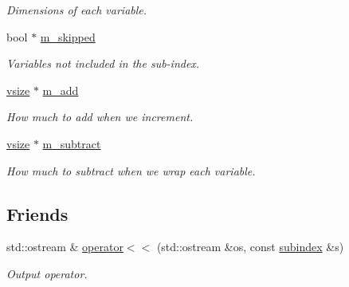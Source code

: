 \begin{DoxyCompactItemize}
\begin{DoxyCompactList}\small\item\em Dimensions of each variable. \end{DoxyCompactList}\item 
\hypertarget{classmerlin_1_1subindex_a5b9ae8404bdc32036922ee2c220da5dc}{}bool $\ast$ \hyperlink{classmerlin_1_1subindex_a5b9ae8404bdc32036922ee2c220da5dc}{m\+\_\+skipped}\label{classmerlin_1_1subindex_a5b9ae8404bdc32036922ee2c220da5dc}

\begin{DoxyCompactList}\small\item\em Variables not included in the sub-\/index. \end{DoxyCompactList}\item 
\hypertarget{classmerlin_1_1subindex_a1dde0ca8f1664ef945f74070711f6816}{}\hyperlink{classmerlin_1_1subindex_a85a7fddb94bd83a77a4a73293c5d613a}{vsize} $\ast$ \hyperlink{classmerlin_1_1subindex_a1dde0ca8f1664ef945f74070711f6816}{m\+\_\+add}\label{classmerlin_1_1subindex_a1dde0ca8f1664ef945f74070711f6816}

\begin{DoxyCompactList}\small\item\em How much to add when we increment. \end{DoxyCompactList}\item 
\hypertarget{classmerlin_1_1subindex_a4366c38983a38191319f53bbee8461ad}{}\hyperlink{classmerlin_1_1subindex_a85a7fddb94bd83a77a4a73293c5d613a}{vsize} $\ast$ \hyperlink{classmerlin_1_1subindex_a4366c38983a38191319f53bbee8461ad}{m\+\_\+subtract}\label{classmerlin_1_1subindex_a4366c38983a38191319f53bbee8461ad}

\begin{DoxyCompactList}\small\item\em How much to subtract when we wrap each variable. \end{DoxyCompactList}\end{DoxyCompactItemize}
\subsection*{Friends}
\begin{DoxyCompactItemize}
\item 
\hypertarget{classmerlin_1_1subindex_ae3af7027432ef1db960d32c52007877d}{}std\+::ostream \& \hyperlink{classmerlin_1_1subindex_ae3af7027432ef1db960d32c52007877d}{operator$<$$<$} (std\+::ostream \&os, const \hyperlink{classmerlin_1_1subindex}{subindex} \&s)\label{classmerlin_1_1subindex_ae3af7027432ef1db960d32c52007877d}

\begin{DoxyCompactList}\small\item\em Output operator. \end{DoxyCompactList}\end{DoxyCompactItemize}


